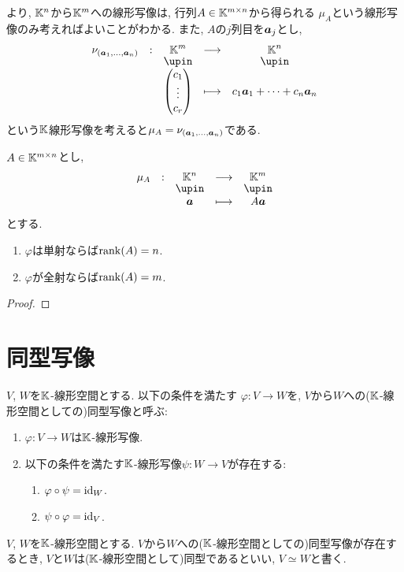 \begin{remark}
より,
$\mathbb{K}^n$から$\mathbb{K}^m$への線形写像は,
行列$A\in\mathbb{K}^{m\times n}$から得られる
$\mu_A$という線形写像のみ考えればよいことがわかる.
また, $A$の$j$列目を$\boldsymbol{a}_j$とし,
\begin{align*}
\shazo{\nu_{(\aaa_1,\ldots,\aaa_n)}}{\KK^m}{\KK^n}
      {\begin{pmatrix}c_1\\\vdots\\c_r\end{pmatrix}}{c_1\aaa_1+\cdots+c_n\aaa_n}
\end{align*}
という$\mathbb{K}$線形写像を考えると$\mu_A=\nu_{(\boldsymbol{a}_1,\ldots,\boldsymbol{a}_n)}$である.
\end{remark}

\begin{prop}
$A\in\mathbb{K}^{m\times n}$とし,
\begin{align*}
\shazo{\mu_A}{\KK^n}{\KK^m}
{\aaa}{A\aaa}
\end{align*}
とする.
\begin{enumerate}
\item $\varphi$は単射ならば$\operatorname{rank}(A)=n$.
\item $\varphi$が全射ならば$\operatorname{rank}(A)=m$.
\end{enumerate}
\end{prop}
\begin{proof}\end{proof}

\section{同型写像}

\begin{definition}
  $V$, $W$を$\mathbb{K}$-線形空間とする.
  以下の条件を満たす
  $\varphi\colon V\to W$を,
  $V$から$W$への($\mathbb{K}$-線形空間としての)同型写像と呼ぶ:
  \begin{enumerate}
  \item $\varphi\colon V\to W$は$\mathbb{K}$-線形写像.
  \item 以下の条件を満たす$\mathbb{K}$-線形写像$\psi\colon W \to V$が存在する:
    \begin{enumerate}
      \item $\varphi\circ \psi=\operatorname{id}_W$.
      \item $\psi\circ \varphi=\operatorname{id}_V$.
    \end{enumerate}
  \end{enumerate}
\end{definition}
\begin{definition}
  $V$, $W$を$\mathbb{K}$-線形空間とする.
  $V$から$W$への($\mathbb{K}$-線形空間としての)同型写像が存在するとき,
  $V$と$W$は($\mathbb{K}$-線形空間として)同型であるといい,  
  $V\simeq W$と書く.
\end{definition}

